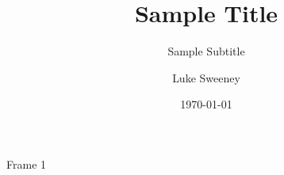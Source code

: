 \documentclass{beamer}
\title{Sample Title}
\subtitle{Sample Subtitle}
\author{Luke Sweeney}
\date{\today}
\begin{document}
    \frame{\titlepage}



    \begin{frame}
        Frame 1
    \end{frame}
\end{document}
